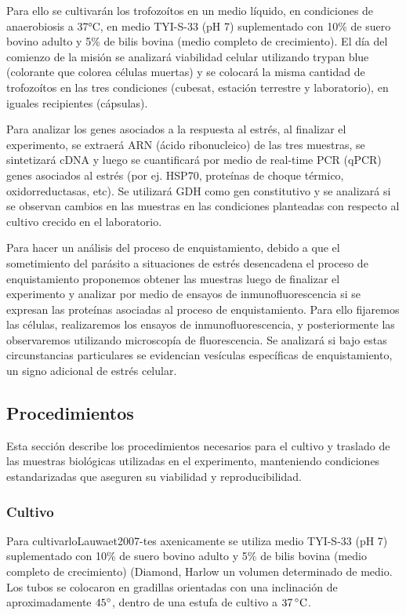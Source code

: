     Para ello se cultivarán los trofozoítos en un medio líquido, en condiciones de anaerobiosis a 37°C, en medio
    TYI-S-33 (pH 7) suplementado con 10\% de suero bovino adulto y 5\% de bilis bovina (medio completo de crecimiento).
    El día del comienzo de la misión se analizará viabilidad celular utilizando trypan blue (colorante que colorea
    células muertas) y se colocará la misma cantidad de trofozoítos en las tres condiciones (cubesat, estación
    terrestre y laboratorio), en iguales recipientes (cápsulas).

    Para analizar los genes asociados a la respuesta al estrés, al finalizar el experimento, se extraerá ARN (ácido
    ribonucleico) de las tres muestras, se sintetizará cDNA y luego se cuantificará por medio de real-time PCR (qPCR)
    genes asociados al estrés (por ej. HSP70, proteínas de choque térmico, oxidorreductasas, etc). Se utilizará GDH
    como gen constitutivo y se analizará si se observan cambios en las muestras en las condiciones planteadas con
    respecto al cultivo crecido en el laboratorio.

    Para hacer un análisis del proceso de enquistamiento, debido a que el sometimiento del parásito a situaciones de
    estrés desencadena el proceso de enquistamiento proponemos obtener las muestras luego de finalizar el experimento
    y analizar por medio de ensayos de inmunofluorescencia si se expresan las proteínas asociadas al proceso de
    enquistamiento. Para ello fijaremos las células, realizaremos los ensayos de inmunofluorescencia, y posteriormente
    las observaremos utilizando microscopía de fluorescencia. Se analizará si bajo estas circunstancias particulares se
    evidencian vesículas específicas de enquistamiento, un signo adicional de estrés celular.

  \subsection{Procedimientos}
    Esta sección describe los procedimientos necesarios para el cultivo y traslado de las muestras
    biológicas utilizadas en el experimento, manteniendo condiciones estandarizadas que
    aseguren su viabilidad y reproducibilidad.

    \subsubsection{Cultivo}
    Para cultivarloLauwaet2007-tes axenicamente se utiliza medio TYI-S-33 (pH 7) suplementado con 10\% de
    suero bovino adulto y 5\% de bilis bovina (medio completo de crecimiento) (Diamond, Harlow
    un volumen determinado de medio. Los tubos se colocaron en gradillas orientadas con una
    inclinación de aproximadamente $45^{\circ}$, dentro de una estufa de cultivo a $37 \,^\circ\mathrm{C}$.

